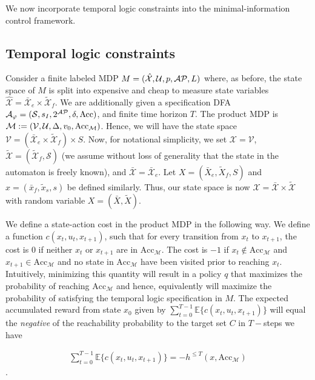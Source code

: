 We now incorporate temporal logic constraints into the minimal-information control framework.
\subsection{Temporal logic constraints}
Consider a finite labeled MDP $M=(\mathcal{\hat{X}},\mathcal{U},p,\mathcal{AP},L)$ where, as before, the state space of $M$ is split into expensive and cheap to measure state variables $\mathcal{\hat{X}} = \mathcal{\bar{X}}_e \times \mathcal{\tilde{X}}_f$. We are additionally given a specification DFA $\mathcal{A}_{\varphi} = (\mathcal{S},s_I,2^{\mathcal{AP}}, \delta,\textrm{Acc})$, and finite time horizon $T$. The product MDP is $\mathcal{M}:= (\mathcal{V},\mathcal{U}, \Delta,v_0,\textrm{Acc}_{\mathcal{M}})$.  Hence, we will have the state space $\mathcal{V} = (\mathcal{\bar{X}}_e \times \mathcal{\tilde{X}}_f) \times S$. Now, for notational simplicity, we set $\mathcal{X} = \mathcal{V}$, $\mathcal{\tilde{X}} = (\mathcal{\tilde{X}}_f,\mathcal{S})$ (we assume without loss of generality that the state in the automaton is freely known), and $\mathcal{\bar{X}} = \mathcal{\bar{X}}_e$. Let $X = (\bar{X}_e,\tilde{X}_f,S)$ and $x = (\bar{x}_f,\tilde{x}_s,s)$ be defined similarly. Thus, our state space is now $\mathcal{X}= \mathcal{\bar{X}} \times \mathcal{\tilde{X}}$ with random variable $X = (\bar{X},\tilde{X})$. 

We define a state-action cost in the product MDP in the following way. We define a function $c(x_t,u_t,x_{t+1})$, such that for every transition from $x_t$ to $x_{t+1}$, the cost is $0$ if neither $x_t$ or $x_{t+1}$ are in $\textrm{Acc}_{\mathcal{M}}$. The cost is $-1$ if $x_t \notin \textrm{Acc}_{\mathcal{M}}$ and $x_{t+1} \in \textrm{Acc}_{\mathcal{M}}$ and no state in $\textrm{Acc}_{\mathcal{M}}$ have been visited prior to reaching $x_t$.  Intuitively, minimizing this quantity will result in a policy $q$ that maximizes the probability of reaching $\textrm{Acc}_{\mathcal{M}}$ and hence, equivalently will maximize the probability of satisfying the temporal logic specification in $M$. The expected accumulated reward from state $x_0$ given by $\sum_{t=0}^{T-1}\mathbb{E}\{c(x_t,u_t,x_{t+1})\}$ will equal the \emph{negative} of the reachability probability to the target set $C$ in $T-$steps \ie we have

\begin{align}\label{eqn:cost}
\sum_{t=0}^{T-1}\mathbb{E}\{c(x_t,u_t,x_{t+1})\} = -h^{\leq T}(x,\textrm{Acc}_{\mathcal{M}})
\end{align}.

